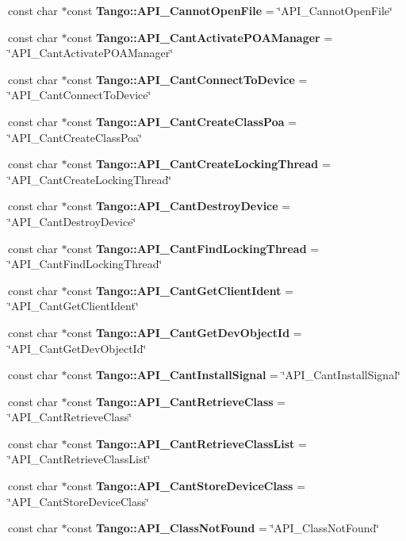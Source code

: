 \begin{DoxyCompactItemize}
\item 
const char $\ast$const {\bf Tango\-::\-A\-P\-I\-\_\-\-Cannot\-Open\-File} = \char`\"{}A\-P\-I\-\_\-\-Cannot\-Open\-File\char`\"{}
\item 
const char $\ast$const {\bf Tango\-::\-A\-P\-I\-\_\-\-Cant\-Activate\-P\-O\-A\-Manager} = \char`\"{}A\-P\-I\-\_\-\-Cant\-Activate\-P\-O\-A\-Manager\char`\"{}
\item 
const char $\ast$const {\bf Tango\-::\-A\-P\-I\-\_\-\-Cant\-Connect\-To\-Device} = \char`\"{}A\-P\-I\-\_\-\-Cant\-Connect\-To\-Device\char`\"{}
\item 
const char $\ast$const {\bf Tango\-::\-A\-P\-I\-\_\-\-Cant\-Create\-Class\-Poa} = \char`\"{}A\-P\-I\-\_\-\-Cant\-Create\-Class\-Poa\char`\"{}
\item 
const char $\ast$const {\bf Tango\-::\-A\-P\-I\-\_\-\-Cant\-Create\-Locking\-Thread} = \char`\"{}A\-P\-I\-\_\-\-Cant\-Create\-Locking\-Thread\char`\"{}
\item 
const char $\ast$const {\bf Tango\-::\-A\-P\-I\-\_\-\-Cant\-Destroy\-Device} = \char`\"{}A\-P\-I\-\_\-\-Cant\-Destroy\-Device\char`\"{}
\item 
const char $\ast$const {\bf Tango\-::\-A\-P\-I\-\_\-\-Cant\-Find\-Locking\-Thread} = \char`\"{}A\-P\-I\-\_\-\-Cant\-Find\-Locking\-Thread\char`\"{}
\item 
const char $\ast$const {\bf Tango\-::\-A\-P\-I\-\_\-\-Cant\-Get\-Client\-Ident} = \char`\"{}A\-P\-I\-\_\-\-Cant\-Get\-Client\-Ident\char`\"{}
\item 
const char $\ast$const {\bf Tango\-::\-A\-P\-I\-\_\-\-Cant\-Get\-Dev\-Object\-Id} = \char`\"{}A\-P\-I\-\_\-\-Cant\-Get\-Dev\-Object\-Id\char`\"{}
\item 
const char $\ast$const {\bf Tango\-::\-A\-P\-I\-\_\-\-Cant\-Install\-Signal} = \char`\"{}A\-P\-I\-\_\-\-Cant\-Install\-Signal\char`\"{}
\item 
const char $\ast$const {\bf Tango\-::\-A\-P\-I\-\_\-\-Cant\-Retrieve\-Class} = \char`\"{}A\-P\-I\-\_\-\-Cant\-Retrieve\-Class\char`\"{}
\item 
const char $\ast$const {\bf Tango\-::\-A\-P\-I\-\_\-\-Cant\-Retrieve\-Class\-List} = \char`\"{}A\-P\-I\-\_\-\-Cant\-Retrieve\-Class\-List\char`\"{}
\item 
const char $\ast$const {\bf Tango\-::\-A\-P\-I\-\_\-\-Cant\-Store\-Device\-Class} = \char`\"{}A\-P\-I\-\_\-\-Cant\-Store\-Device\-Class\char`\"{}
\item 
const char $\ast$const {\bf Tango\-::\-A\-P\-I\-\_\-\-Class\-Not\-Found} = \char`\"{}A\-P\-I\-\_\-\-Class\-Not\-Found\char`\"{}

\end{DoxyCompactItemize}
